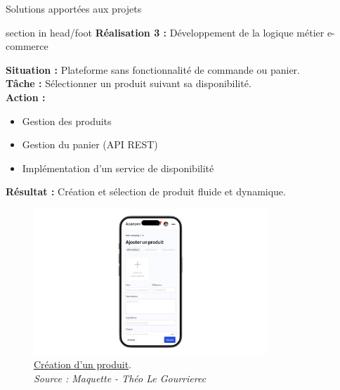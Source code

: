 \documentclass{beamer}
\begin{document}
\begin{frame}{Solutions apportées aux projets}
	\begin{beamercolorbox}[wd=\paperwidth,ht=1.5em,dp=0.5em,leftskip=0.5cm]{section in head/foot}
  		\large \textbf{Réalisation 3 :} \normalsize Développement de la logique métier e-commerce
	\end{beamercolorbox}
	\vspace{0.5em}
	\begin{center}
		 {
  			\begin{minipage}{0.9\textwidth}
  				\textbf{Situation :} Plateforme sans fonctionnalité de commande ou panier.\\
  				\textbf{Tâche :} Sélectionner un produit suivant sa disponibilité.\\
  				\textbf{Action :}
				\begin{itemize}
					\item Gestion des produits
					\item Gestion du panier (API REST)
					\item Implémentation d'un service de disponibilité
				\end{itemize}
				\textbf{Résultat :} Création et sélection de produit fluide et dynamique.
  			\end{minipage}
  		}
  		
  		\only<2> {
			\begin{figure}[t]
  				\includegraphics[height=5.5cm]{../img/maquette/crud_produit.png}
				\caption{	
					\centering			
  					\href{https://github.com/Matteo-K/Soutenance_E-delic/blob/main/img/maquette/crud_produit.png}{\underline{Création d'un produit}}.\\
  					\textit{Source : Maquette - Théo Le Gourrierec}
				}
  				\label{fig:crud_produit}
  			\end{figure}
		}
		

\end{center}
\end{frame}
\end{document}
